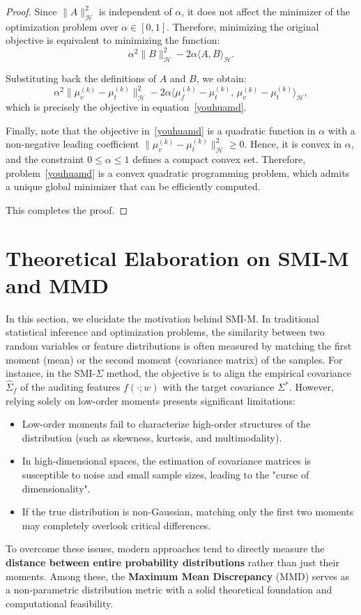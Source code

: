 \documentclass{article}
\theoremstyle{plain}
\theoremstyle{definition}
\theoremstyle{remark}
\begin{document}
\begin{proof}
Since $\|A\|_{\mathcal{H}}^2$ is independent of $\alpha$, it does not affect the minimizer of the optimization problem over $\alpha \in [0,1]$. Therefore, minimizing the original objective is equivalent to minimizing the function:
\begin{equation}
\alpha^2 \|B\|_{\mathcal{H}}^2 - 2\alpha \langle A, B \rangle_{\mathcal{H}}.
\end{equation}

Substituting back the definitions of $A$ and $B$, we obtain:
\begin{equation}
\alpha^2 \|\mu^{(k)}_v - \mu^{(k)}_t\|_{\mathcal{H}}^2 - 2\alpha \langle \mu^{(k)}_f - \mu^{(k)}_t,\, \mu^{(k)}_v - \mu^{(k)}_t \rangle_{\mathcal{H}},
\end{equation}
which is precisely the objective in equation~\eqref{youhuamd}.

Finally, note that the objective in~\eqref{youhuamd} is a quadratic function in $\alpha$ with a non-negative leading coefficient $\|\mu^{(k)}_v - \mu^{(k)}_t\|_{\mathcal{H}}^2 \geq 0$. Hence, it is convex in $\alpha$, and the constraint $0 \leq \alpha \leq 1$ defines a compact convex set. Therefore, problem~\eqref{youhuamd} is a convex quadratic programming problem, which admits a unique global minimizer that can be efficiently computed.

This completes the proof.
\end{proof}

\section{Theoretical Elaboration on SMI-M and MMD}\label{mmd}
In this section, we elucidate the motivation behind SMI-M. In traditional statistical inference and optimization problems, the similarity between two random variables or feature distributions is often measured by matching the first moment (mean) or the second moment (covariance matrix) of the samples. For instance, in the SMI-$\Sigma$ method, the objective is to align the empirical covariance $\widehat{\Sigma}_f$ of the auditing features $f(\cdot; w)$ with the target covariance $\Sigma^\ast$. However, relying solely on low-order moments presents significant limitations:
\begin{itemize}
    \item Low-order moments fail to characterize high-order structures of the distribution (such as skewness, kurtosis, and multimodality).
    \item In high-dimensional spaces, the estimation of covariance matrices is susceptible to noise and small sample sizes, leading to the "curse of dimensionality".
    \item If the true distribution is non-Gaussian, matching only the first two moments may completely overlook critical differences.
\end{itemize}
To overcome these issues, modern approaches tend to directly measure the \textbf{distance between entire probability distributions} rather than just their moments. Among these, the \textbf{Maximum Mean Discrepancy} (MMD) serves as a non-parametric distribution metric with a solid theoretical foundation and computational feasibility.
\end{document}
